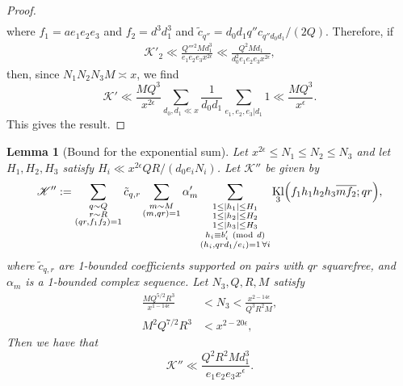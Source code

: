 \documentclass[10pt]{amsart}
\theoremstyle{plain}
\newtheorem{lmm}[thrm]{Lemma}
\numberwithin{equation}{section}
\DeclareMathOperator{\Kl}{Kl}
\newcommand{\Mod}[1]{\ (\mathrm{mod}\ #1)}
\begin{document}
\begin{proof}
\begin{align*}
\end{align*}
where $f_1=a e_1e_2e_3$ and $f_2=d^3d_1^3$ and $\tilde{c}_{q''}=d_0d_1q'' c_{q''d_0 d_1}/(2Q)$.  Therefore, if 
\begin{align}
\mathscr{K}'_2\ll \frac{Q'''{}^2 M d_1^3}{e_1e_2e_3 x^{2\epsilon}} \ll \frac{ Q^2 M d_1}{d_0^2 e_1e_2e_3 x^{2\epsilon}},
\label{eq:E2Target}
\end{align}
then, since $N_1N_2N_3 M\asymp x$, we find
\[
\mathscr{K}'\ll \frac{M Q^3}{x^{2\epsilon}}\sum_{d_0,d_1\ll x}\frac{1}{d_0d_1}\sum_{e_1,e_2,e_3|d_1}1\ll \frac{M Q^3}{x^{\epsilon}}.
\]
This gives the result.
\end{proof}
%
%
%
%
%
%
%
%
\begin{lmm}[Bound for the exponential sum]\label{lmm:K3}
Let $x^{2\epsilon}\le N_1\le N_2\le N_3$ and let $H_1,H_2,H_3$ satisfy $H_i\ll x^{2\epsilon}QR/(d_0e_i N_i)$. Let $\mathscr{K}''$ be given by
\[
\mathscr{K}'':=\sum_{\substack{q\sim Q\\ r\sim R\\(q r,f_1f_2)=1}}\tilde{c}_{q,r}\sum_{\substack{m\sim M\\ (m,q r)=1}}\alpha'_m\sum_{\substack{1\le |h_1|\le H_1\\ 1\le |h_2|\le H_2 \\ 1\le |h_3|\le H_3\\ h_i\equiv b_i'\Mod{d}\\ (h_i,q r d_1/e_i)=1\,\forall i}}\Kl_3\Bigl(f_1 h_1 h_2 h_3 \overline{m f_2};q r\Bigr),
\]
where $\tilde{c}_{q,r}$ are 1-bounded coefficients supported on pairs with $qr$ squarefree, and $\alpha_m$ is a 1-bounded complex sequence. Let $N_3,Q,R,M$ satisfy
\begin{align}
\frac{M Q^{5/2} R^3}{x^{1-14\epsilon}}&<N_3< \frac{x^{2-14\epsilon} }{Q^3 R^2 M},
\label{eq:N3Constraint}\\
M^2 Q^{7/2} R^{3}&<x^{2-20\epsilon},
\label{eq:MConstraint}
\end{align}
Then we have that
\[
\mathscr{K}''\ll \frac{Q^2 R^2 M d_1^3}{ e_1e_2e_3 x^\epsilon }.
\]
\end{lmm}
%
%
%
%
\end{document}
